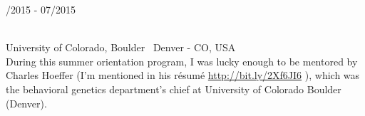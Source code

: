 \begin{minipage}{.3\textwidth}
	/2015 - 07/2015 \faCalendar
\end{minipage}
\hfill
\begin{minipage}{.65\textwidth}
	\vfill
	 \\
	\color{Maroon} University of Colorado, Boulder \color{Sepia} \hfill \faMapMarker \ Denver - CO, USA
	\smallskip
	\\
	\color{gray} During this summer orientation program, I was lucky enough to be mentored by Charles Hoeffer (I'm mentioned in his résumé { \color{SkyBlue} \url{http://bit.ly/2Xf6JI6} \hspace{0.15em} \faFile}), which was the behavioral genetics department's chief at University of Colorado Boulder (Denver).
	\vfill
\end{minipage}
